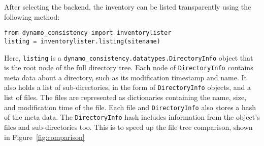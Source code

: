After selecting the backend,
the inventory can be listed transparently using the following method:

\begin{verbatim}
from dynamo_consistency import inventorylister
listing = inventorylister.listing(sitename)
\end{verbatim}

Here, \texttt{listing} is a \texttt{dynamo\_consistency.datatypes.DirectoryInfo} object
that is the root node of the full directory tree.
Each node of \texttt{DirectoryInfo} contains meta data about a directory,
such as its modification timestamp and name.
It also holds a list of sub-directories, in the form of \texttt{DirectoryInfo} objects,
and a list of files.
The files are represented as dictionaries containing the name, size,
and modification time of the file.
Each file and \texttt{DirectoryInfo} also stores a hash of the meta data.
The \texttt{DirectoryInfo} hash includes information from the object’s
files and sub-directories too.
This is to speed up the file tree comparison, shown in Figure~\ref{fig:comparison}

